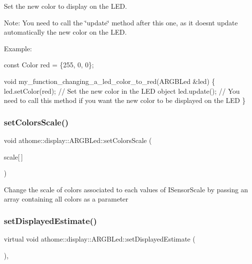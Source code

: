Set the new color to display on the L\+ED.

Note\+: You need to call the \char`\"{}update\char`\"{} method after this one, as it doesn\textquotesingle{}t update automatically the new color on the L\+ED.

Example\+:


\begin{DoxyCode}
\textcolor{keyword}{const} Color red = \{255, 0, 0\};

\textcolor{keywordtype}{void} my\_function\_changing\_a\_led\_color\_to\_red(ARGBLed &led) \{
  led.setColor(red); \textcolor{comment}{// Set the new color in the LED object}
  led.update(); \textcolor{comment}{// You need to call this method if you want the new color}
to be displayed on the LED
\}
\end{DoxyCode}
 \mbox{\label{classathome_1_1display_1_1_a_r_g_b_led_a411b35199d593b813bad7d9056678198}} 
\subsubsection{\texorpdfstring{set\+Colors\+Scale()}{setColorsScale()}}
{\footnotesize\ttfamily void athome\+::display\+::\+A\+R\+G\+B\+Led\+::set\+Colors\+Scale (\begin{DoxyParamCaption}\item[{const \mbox{\hyperlink{structathome_1_1display_1_1_a_r_g_b_led_1_1_color}{Color}}}]{scale\mbox{[}$\,$\mbox{]} }\end{DoxyParamCaption})\hspace{0.3cm}{\ttfamily [inline]}}

Change the scale of colors associated to each values of I\+Sensor\+Scale by passing an array containing all colors as a parameter \mbox{\label{classathome_1_1display_1_1_a_r_g_b_led_a1e6a934912f71a5ea06df1d28cf5ace9}} 
\subsubsection{\texorpdfstring{set\+Displayed\+Estimate()}{setDisplayedEstimate()}}
{\footnotesize\ttfamily virtual void athome\+::display\+::\+A\+R\+G\+B\+Led\+::set\+Displayed\+Estimate (\begin{DoxyParamCaption}\item[{\mbox{\hyperlink{classathome_1_1sensor_1_1_i_sensor_aa70bc27a4c17c86caf96cca776541ddf}{sensor\+::\+I\+Sensor\+::\+I\+Sensor\+Scale}}}]{ }\end{DoxyParamCaption})\hspace{0.3cm}{\ttfamily [inline]}, {\ttfamily [virtual]}}

